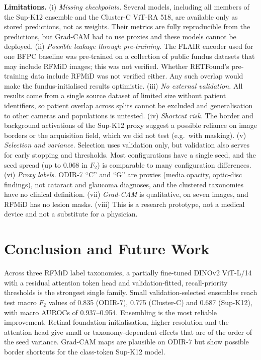﻿\documentclass[conference]{IEEEtran}
\begin{document}
\textbf{Limitations.}
(i) \emph{Missing checkpoints.} Several models, including all members of the Sup-K12 ensemble and the Cluster-C ViT-RA 518, are available only as stored predictions, not as weights. Their metrics are fully reproducible from the predictions, but Grad-CAM had to use proxies and these models cannot be deployed.
(ii) \emph{Possible leakage through pre-training.} The FLAIR encoder used for one BFPC baseline was pre-trained on a collection of public fundus datasets that may include RFMiD images; this was not verified. Whether RETFound's pre-training data include RFMiD was not verified either. Any such overlap would make the fundus-initialised results optimistic.
(iii) \emph{No external validation.} All results come from a single source dataset of limited size without patient identifiers, so patient overlap across splits cannot be excluded and generalisation to other cameras and populations is untested.
(iv) \emph{Shortcut risk.} The border and background activations of the Sup-K12 proxy suggest a possible reliance on image borders or the acquisition field, which we did not test (e.g.\ with masking).
(v) \emph{Selection and variance.} Selection uses validation only, but validation also serves for early stopping and thresholds. Most configurations have a single seed, and the seed spread (up to 0.068 in $F_2$) is comparable to many configuration differences.
(vi) \emph{Proxy labels.} ODIR-7 ``C'' and ``G'' are proxies (media opacity, optic-disc findings), not cataract and glaucoma diagnoses, and the clustered taxonomies have no clinical definition.
(vii) \emph{Grad-CAM} is qualitative, on seven images, and RFMiD has no lesion masks.
(viii) This is a research prototype, not a medical device and not a substitute for a physician.

\section{Conclusion and Future Work}
Across three RFMiD label taxonomies, a partially fine-tuned DINOv2 ViT-L/14 with a residual attention token head and validation-fitted, recall-priority thresholds is the strongest single family. Small validation-selected ensembles reach test macro $F_2$ values of 0.835 (ODIR-7), 0.775 (Cluster-C) and 0.687 (Sup-K12), with macro AUROCs of 0.937--0.954.
Ensembling is the most reliable improvement. Retinal foundation initialisation, higher resolution and the attention head give small or taxonomy-dependent effects that are of the order of the seed variance.
Grad-CAM maps are plausible on ODIR-7 but show possible border shortcuts for the class-token Sup-K12 model.
\end{document}
